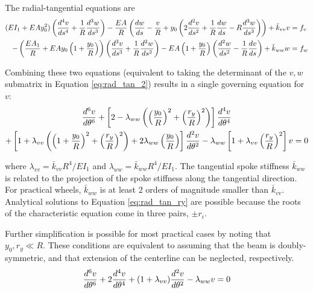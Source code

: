\documentclass[\rootdir/thesis.tex]{subfiles}
\begin{document}
The radial-tangential equations are
\begin{subequations}
\begin{align}
\label{eq:rad_tan_2}
(EI_1 + EAy_0^2)\left( \frac{d^4v}{ds^4} + \frac{1}{R}\frac{d^3w}{ds^3} \right) -
    \frac{EA}{R}\left( \frac{dw}{ds} - \frac{v}{R} +y_0\left(2\frac{d^2v}{ds^2} + \frac{1}{R}\frac{dw}{ds} -
    R\frac{d^3w}{ds^3}\right) \right) +\bar{k}_{vv}v &= f_v\\
-\left( \frac{EA_1}{R} + EAy_0\left( 1 + \frac{y_0}{R} \right) \right)
    \left(\frac{d^3v}{ds^3} + \frac{1}{R}\frac{d^2w}{ds^2} \right) -
    EA\left(1+\frac{y_0}{R} \right) \left(\frac{d^2w}{ds^2} - \frac{1}{R}\frac{dv}{ds} \right) + \bar{k}_{ww}w &= f_w
\end{align}
\end{subequations}

Combining these two equations (equivalent to taking the determinant of the $v,w$ submatrix in Equation \eqref{eq:rad_tan_2}) results in a single governing equation for $v$:
\begin{multline}
\label{eq:rad_tan_ry}
\frac{d^6v}{d\theta^6} + \left[2-\lambda_{ww}\left(\left(\frac{y_0}{R}\right)^2 +
                                        \left(\frac{r_y}{R}\right)^2 \right) \right] \frac{d^4v}{d\theta^4}\\
          + \left[1+\lambda_{vv}\left(\left(1+\frac{y_0}{R}\right)^2+\left(\frac{r_y}{R}\right)^2\right)
                   +2\lambda_{ww}\left(\frac{y_0}{R}\right)\right]\frac{d^2v}{d\theta^2}
          - \lambda_{ww}\left[1+\lambda_{vv}\left(\frac{r_y}{R}\right)^2\right] v = 0
\end{multline}

where $\lambda_{vv}=\bar{k}_{vv}R^4/EI_1$ and $\lambda_{ww}=\bar{k}_{ww}R^4/EI_1$. The tangential spoke stiffness $\bar{k}_{ww}$ is related to the projection of the spoke stiffness along the tangential direction. For practical wheels, $\bar{k}_{ww}$ is at least 2 orders of magnitude smaller than $\bar{k}_{vv}$. Analytical solutions to Equation \eqref{eq:rad_tan_ry} are possible because the roots of the characteristic equation come in three pairs, $\pm r_i$.

Further simplification is possible for most practical cases by noting that $y_0,r_y \ll R$. These conditions are equivalent to assuming that the beam is doubly-symmetric, and that extension of the centerline can be neglected, respectively.
\begin{equation}
\label{eq:rad_tan}
\frac{d^6v}{d\theta^6} + 2\frac{d^4v}{d\theta^4}+(1+\lambda_{vv})\frac{d^2v}{d\theta^2} - \lambda_{ww}v=0
\end{equation}
\end{document}
